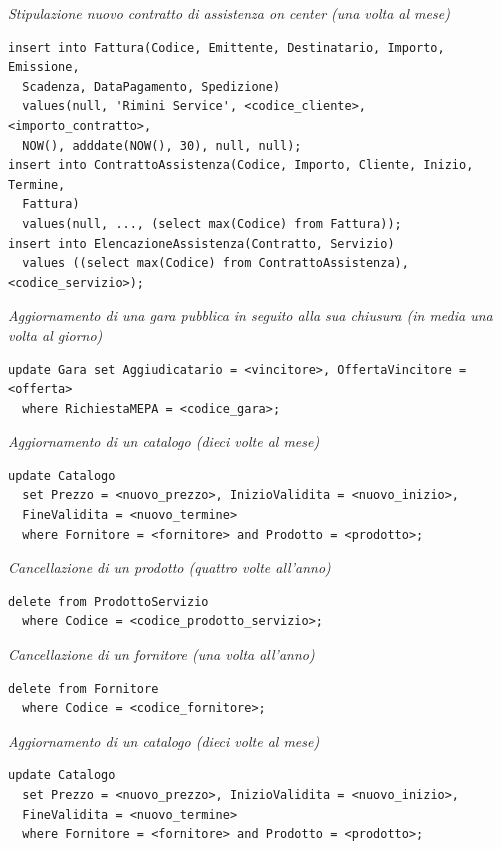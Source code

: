 \noindent\textit{Stipulazione nuovo contratto di assistenza on center (una volta al mese)}
\begin{verbatim}
insert into Fattura(Codice, Emittente, Destinatario, Importo, Emissione,
  Scadenza, DataPagamento, Spedizione)
  values(null, 'Rimini Service', <codice_cliente>, <importo_contratto>,
  NOW(), adddate(NOW(), 30), null, null);
insert into ContrattoAssistenza(Codice, Importo, Cliente, Inizio, Termine,
  Fattura)
  values(null, ..., (select max(Codice) from Fattura));
insert into ElencazioneAssistenza(Contratto, Servizio)
  values ((select max(Codice) from ContrattoAssistenza), <codice_servizio>);
\end{verbatim}
\vspace{1cm}

\noindent\textit{Aggiornamento di una gara pubblica in seguito alla sua chiusura (in media una volta al giorno)}
\begin{verbatim}
update Gara set Aggiudicatario = <vincitore>, OffertaVincitore = <offerta>
  where RichiestaMEPA = <codice_gara>;
\end{verbatim}
\vspace{1cm}

\noindent\textit{Aggiornamento di un catalogo (dieci volte al mese)}
\begin{verbatim}
update Catalogo
  set Prezzo = <nuovo_prezzo>, InizioValidita = <nuovo_inizio>,
  FineValidita = <nuovo_termine>
  where Fornitore = <fornitore> and Prodotto = <prodotto>;
\end{verbatim}
\vspace{1cm}

\noindent\textit{Cancellazione di un prodotto (quattro volte all'anno)}
\begin{verbatim}
delete from ProdottoServizio
  where Codice = <codice_prodotto_servizio>;
\end{verbatim}
\vspace{1cm}

\noindent\textit{Cancellazione di un fornitore (una volta all'anno)}
\begin{verbatim}
delete from Fornitore
  where Codice = <codice_fornitore>;
\end{verbatim}
\vspace{1cm}

\noindent\textit{Aggiornamento di un catalogo (dieci volte al mese)}
\begin{verbatim}
update Catalogo
  set Prezzo = <nuovo_prezzo>, InizioValidita = <nuovo_inizio>,
  FineValidita = <nuovo_termine>
  where Fornitore = <fornitore> and Prodotto = <prodotto>;
\end{verbatim}
\vspace{1cm}


